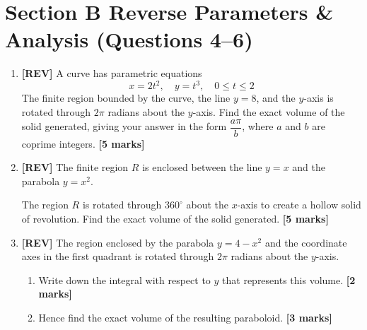 \documentclass[11pt,a4paper]{article}
\begin{document}
\section*{Section B \quad Reverse Parameters \& Analysis \hfill{\normalfont\footnotesize(Questions 4--6)}}
\begin{enumerate}[resume]

\item \textbf{[REV]} A curve has parametric equations
\[
x = 2t^2, \quad y = t^3, \quad 0 \le t \le 2
\]
The finite region bounded by the curve, the line $y = 8$, and the $y$-axis is rotated through $2\pi$ radians about the $y$-axis.
Find the exact volume of the solid generated, giving your answer in the form $\dfrac{a\pi}{b}$, where $a$ and $b$ are coprime integers. \hfill{\textbf{[5 marks]}}

\item \textbf{[REV]} The finite region $R$ is enclosed between the line $y = x$ and the parabola $y = x^2$.
\begin{center}
\end{center}
The region $R$ is rotated through $360^\circ$ about the $x$-axis to create a hollow solid of revolution.
Find the exact volume of the solid generated. \hfill{\textbf{[5 marks]}}

\item \textbf{[REV]} The region enclosed by the parabola $y = 4 - x^2$ and the coordinate axes in the first quadrant is rotated through $2\pi$ radians about the $y$-axis.
\begin{enumerate}[label=(\alph*)]
  \item Write down the integral with respect to $y$ that represents this volume. \hfill{\textbf{[2 marks]}}
  \item Hence find the exact volume of the resulting paraboloid. \hfill{\textbf{[3 marks]}}
\end{enumerate}


\end{enumerate}
\end{document}
